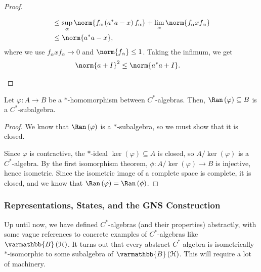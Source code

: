 \documentclass[10pt]{mypackage}
\renewcommand*{\mathbb}[1]{\varmathbb{#1}}
\newcommand{\B}{\mathbb{B}}
\begin{document}
\begin{proof}
\begin{enumerate}[(1)]
\begin{align*}
                     &\leq \sup_{\alpha}\norm{f_{\alpha}\left(a^{\ast}a-x\right)f_{\alpha}} + \lim_{\alpha}\norm{f_{\alpha}xf_{\alpha}}\\
                     &\leq \norm{a^{\ast}a-x},
      \end{align*}
      where we use $f_{\alpha}xf_{\alpha}\rightarrow 0$ and $\norm{f_{\alpha}}\leq 1$. Taking the infimum, we get
      \begin{align*}
        \norm{a+I}^2 &\leq \norm{a^{\ast}a + I}.
      \end{align*}
  \end{enumerate}
\end{proof}
\begin{corollary}
  Let $\varphi\colon A\rightarrow B$ be a $\ast$-homomorphism between $C^{\ast}$-algebras. Then, $\Ran\left(\varphi\right)\subseteq B$ is a $C^{\ast}$-subalgebra.
\end{corollary}
\begin{proof}
  We know that $\Ran\left(\varphi\right)$ is a $\ast$-subalgebra, so we must show that it is closed.\newline

  Since $\varphi$ is contractive, the $\ast$-ideal $\ker\left(\varphi\right)\subseteq A$ is closed, so $A/\ker\left(\varphi\right)$ is a $C^{\ast}$-algebra. By the first isomorphism theorem, $\phi\colon A/ \ker\left(\varphi\right)\rightarrow B$ is injective, hence isometric. Since the isometric image of a complete space is complete, it is closed, and we know that $\Ran\left(\varphi\right) = \Ran\left(\phi\right)$.
\end{proof}
\subsubsection{Representations, States, and the GNS Construction}%
Up until now, we have defined $C^{\ast}$-algebras (and their properties) abstractly, with some vague references to concrete examples of $C^{\ast}$-algebras like $\B\left(\mathcal{H}\right)$. It turns out that every abstract $C^{\ast}$-algebra is isometrically $\ast$-isomorphic to some subalgebra of $\B\left(\mathcal{H}\right)$. This will require a lot of machinery.\newline
\end{document}
